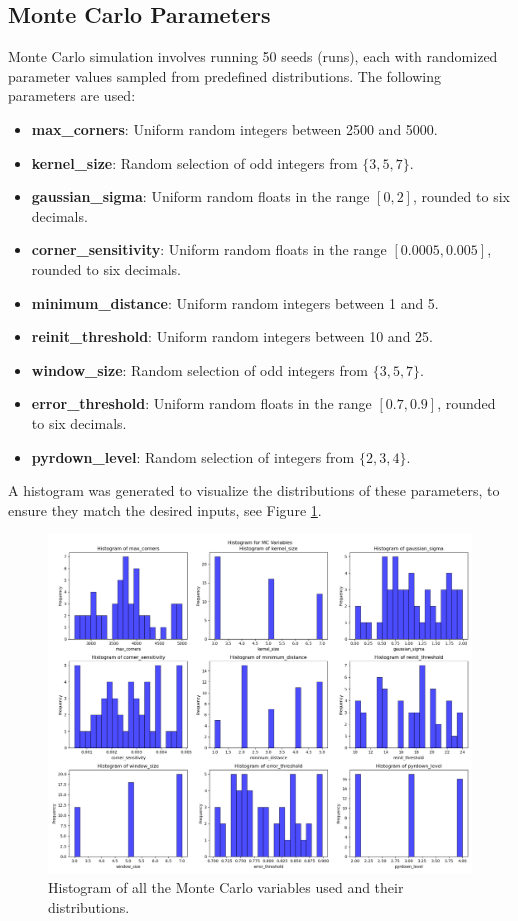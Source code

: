 \documentclass[11pt, conference, letterpaper]{IEEEtran}
\begin{document}
\subsection{Monte Carlo Parameters}

Monte Carlo simulation involves running 50 seeds (runs), each with randomized parameter values sampled from predefined distributions. The following parameters are used:
\begin{itemize}
    \item \textbf{max\_corners}: Uniform random integers between 2500 and 5000.
    \item \textbf{kernel\_size}: Random selection of odd integers from $\{3, 5, 7\}$.
    \item \textbf{gaussian\_sigma}: Uniform random floats in the range $[0, 2]$, rounded to six decimals.
    \item \textbf{corner\_sensitivity}: Uniform random floats in the range $[0.0005, 0.005]$, rounded to six decimals.
    \item \textbf{minimum\_distance}: Uniform random integers between 1 and 5.
    \item \textbf{reinit\_threshold}: Uniform random integers between 10 and 25.
    \item \textbf{window\_size}: Random selection of odd integers from $\{3, 5, 7\}$.
    \item \textbf{error\_threshold}: Uniform random floats in the range $[0.7, 0.9]$, rounded to six decimals.
    \item \textbf{pyrdown\_level}: Random selection of integers from $\{2, 3, 4\}$.
\end{itemize}

A histogram was generated to visualize the distributions of these parameters, to ensure they match the desired inputs, see Figure \ref{fig:mc_hist}.

\begin{figure}[t]
    \centering
    \includegraphics[width=\linewidth]{mc_images/mc_histogram.png}
    \caption{Histogram of all the Monte Carlo variables used and their distributions.}
    \label{fig:mc_hist}
\end{figure}
\end{document}
